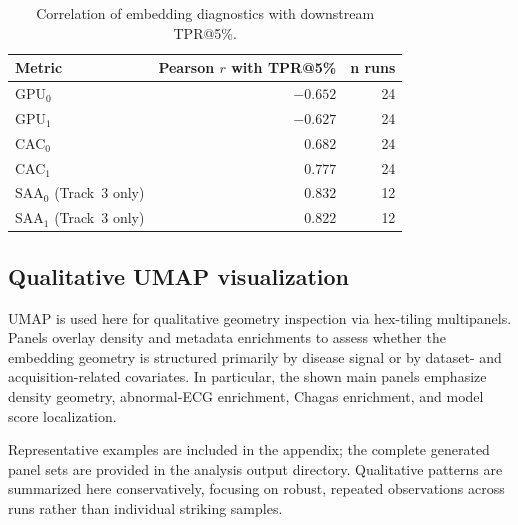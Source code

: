 \begin{table}[H]
  \centering
  \caption{Correlation of embedding diagnostics with downstream TPR@5\%.}
  \label{tab:emb_tpr_corr}
  \begin{tabular}{lrr}
    \toprule
    \textbf{Metric}        & \textbf{Pearson $r$ with TPR@5\%} & \textbf{n runs} \\
    \midrule
    GPU$_0$                & $-0.652$                          & 24              \\
    GPU$_1$                & $-0.627$                          & 24              \\
    CAC$_0$                & $0.682$                           & 24              \\
    CAC$_1$                & $\mathbf{0.777}$                  & 24              \\
    SAA$_0$ (Track~3 only) & $0.832$                           & 12              \\
    SAA$_1$ (Track~3 only) & $0.822$                           & 12              \\
    \bottomrule
  \end{tabular}
\end{table}

\subsection{Qualitative UMAP visualization}
UMAP is used here for qualitative geometry inspection via hex-tiling multipanels.
Panels overlay density and metadata enrichments to assess whether the embedding geometry is structured primarily by disease signal or by dataset- and acquisition-related covariates.
In particular, the shown main panels emphasize density geometry, abnormal-ECG enrichment, Chagas enrichment, and model score localization.

Representative examples are included in the appendix; the complete generated panel sets are provided in the analysis output directory.
Qualitative patterns are summarized here conservatively, focusing on robust, repeated observations across runs rather than individual striking samples.

